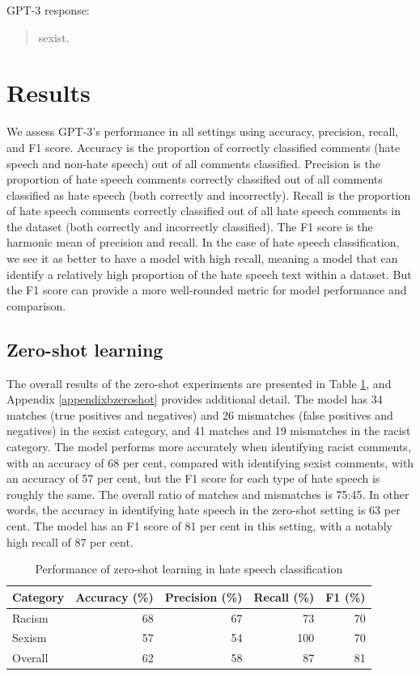 \documentclass[12pt,]{article}
\begin{document}
GPT-3 response:

\begin{quote}
sexist.
\end{quote}

\hypertarget{results}{%
\section{Results}\label{results}}

We assess GPT-3's performance in all settings using accuracy, precision, recall, and F1 score. Accuracy is the proportion of correctly classified comments (hate speech and non-hate speech) out of all comments classified. Precision is the proportion of hate speech comments correctly classified out of all comments classified as hate speech (both correctly and incorrectly). Recall is the proportion of hate speech comments correctly classified out of all hate speech comments in the dataset (both correctly and incorrectly classified). The F1 score is the harmonic mean of precision and recall. In the case of hate speech classification, we see it as better to have a model with high recall, meaning a model that can identify a relatively high proportion of the hate speech text within a dataset. But the F1 score can provide a more well-rounded metric for model performance and comparison.

\hypertarget{zero-shot-learning-1}{%
\subsection{Zero-shot learning}\label{zero-shot-learning-1}}

The overall results of the zero-shot experiments are presented in Table \ref{tab:zeroshot-summary}, and Appendix \ref{appendixbzeroshot} provides additional detail. The model has 34 matches (true positives and negatives) and 26 mismatches (false positives and negatives) in the sexist category, and 41 matches and 19 mismatches in the racist category. The model performs more accurately when identifying racist comments, with an accuracy of 68 per cent, compared with identifying sexist comments, with an accuracy of 57 per cent, but the F1 score for each type of hate speech is roughly the same. The overall ratio of matches and mismatches is 75:45. In other words, the accuracy in identifying hate speech in the zero-shot setting is 63 per cent. The model has an F1 score of 81 per cent in this setting, with a notably high recall of 87 per cent.

\begin{table}

\caption{\label{tab:zeroshot-summary}Performance of zero-shot learning in hate speech classification}
\centering
\begin{tabular}[t]{lrrrr}
\toprule
Category & Accuracy (\%) & Precision (\%) & Recall (\%) & F1 (\%)\\
\midrule
Racism & 68 & 67 & 73 & 70\\
Sexism & 57 & 54 & 100 & 70\\
Overall & 62 & 58 & 87 & 81\\
\bottomrule
\end{tabular}
\end{table}
\end{document}
